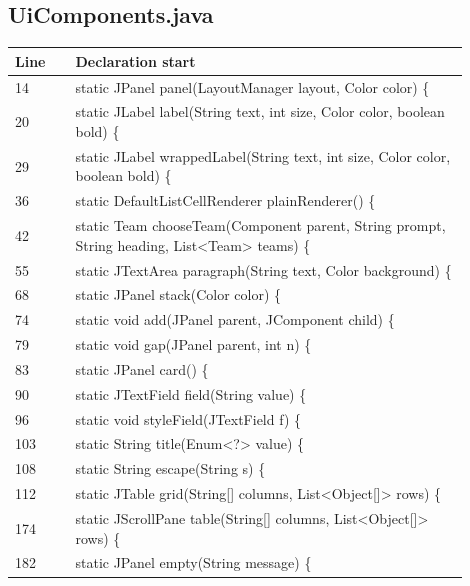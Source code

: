 \subsection*{UiComponents.java}
\begin{longtable}{p{0.12\linewidth}p{0.78\linewidth}}\toprule Line & Declaration start\\\midrule\endhead
14 & static JPanel panel(LayoutManager layout, Color color) \{\\
20 & static JLabel label(String text, int size, Color color, boolean bold) \{\\
29 & static JLabel wrappedLabel(String text, int size, Color color, boolean bold) \{\\
36 & static DefaultListCellRenderer plainRenderer() \{\\
42 & static Team chooseTeam(Component parent, String prompt, String heading, List<Team> teams) \{\\
55 & static JTextArea paragraph(String text, Color background) \{\\
68 & static JPanel stack(Color color) \{\\
74 & static void add(JPanel parent, JComponent child) \{\\
79 & static void gap(JPanel parent, int n) \{\\
83 & static JPanel card() \{\\
90 & static JTextField field(String value) \{\\
96 & static void styleField(JTextField f) \{\\
103 & static String title(Enum<?> value) \{\\
108 & static String escape(String s) \{\\
112 & static JTable grid(String[] columns, List<Object[]> rows) \{\\
174 & static JScrollPane table(String[] columns, List<Object[]> rows) \{\\
182 & static JPanel empty(String message) \{\\
\bottomrule\end{longtable}
